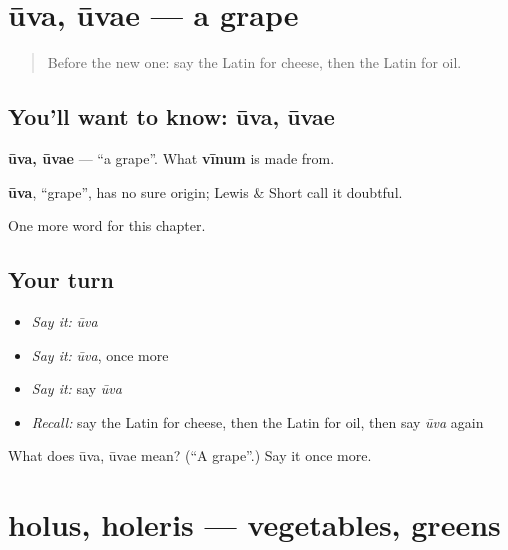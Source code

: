 \section[ūva, ūvae]{ūva, ūvae — a grape}

\label{lesson:LA-C80-uva}



\begin{quote}
Before the new one: say the Latin for cheese, then the Latin for oil.
\end{quote}

\subsection*{You'll want to know: ūva, ūvae}
\textbf{ūva, ūvae} — \textquotedblleft{}a grape\textquotedblright{}. What \textbf{vīnum} is made from.

\begin{cousinweb}
\textbf{ūva}, \textquotedblleft{}grape\textquotedblright{}, has no sure origin; Lewis \& Short call it doubtful.
\end{cousinweb}

\begin{grammarlens}[title={What you've built}]
One more word for this chapter.
\end{grammarlens}

\subsection*{Your turn}
\begin{itemize}
\raggedright
  \item \emph{Say it:} \emph{ūva}
  \item \emph{Say it:} \emph{ūva}, once more
  \item \emph{Say it:} say \emph{ūva}
  \item \emph{Recall:} say the Latin for cheese, then the Latin for oil, then say \emph{ūva} again
\end{itemize}

\begin{tcolorbox}[breakable,colback=teal!4,colframe=teal!35!black,title={Before you move on}]
What does ūva, ūvae mean? (\textquotedblleft{}A grape\textquotedblright{}.) Say it once more.
\end{tcolorbox}
\section[holus, holeris]{holus, holeris — vegetables, greens}

